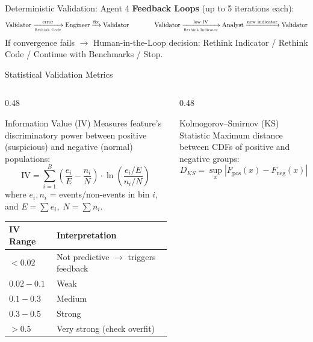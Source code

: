 \documentclass[10pt, aspectratio=169]{beamer}
\newcommand{\hlt}[1]{\textcolor{accentcyan}{#1}}
\newcommand{\hlr}[1]{\textcolor{accentred}{#1}}
\begin{document}
\begin{frame}{Deterministic Validation: Agent 4}
\vspace{0.5em}
\textbf{Feedback Loops} (up to 5 iterations each):
\[
  \text{Validator} \xrightarrow[\text{\tiny Rethink Code}]{\text{error}} \text{Engineer} \xrightarrow{\text{fix}} \text{Validator}
  \qquad\qquad
  \text{Validator} \xrightarrow[\text{\tiny Rethink Indicator}]{\text{low IV}} \text{Analyst} \xrightarrow{\text{new indicator}} \text{Validator}
\]
If convergence fails \(\to\) \hlt{Human-in-the-Loop} decision: Rethink Indicator / Rethink Code / Continue with Benchmarks / Stop.
\end{frame}

\begin{frame}{Statistical Validation Metrics}

\begin{columns}[T]
\begin{column}{0.48\textwidth}
  \begin{block}{Information Value (IV)}
    \scriptsize
    Measures feature's discriminatory power between positive (suspicious) and negative (normal) populations:
    \[
      \text{IV} = \sum_{i=1}^{B} \left(\frac{e_i}{E} - \frac{n_i}{N}\right) \cdot \ln\!\left(\frac{e_i / E}{n_i / N}\right)
    \]
    where \(e_i, n_i\) = events/non-events in bin \(i\), and \(E = \sum e_i,\; N = \sum n_i\).

    \vspace{0.5em}
    \begin{tabular}{ll}
      \toprule
      \textbf{IV Range} & \textbf{Interpretation} \\
      \midrule
      \(< 0.02\) & Not predictive \(\to\) \hlr{triggers feedback} \\
      \(0.02 - 0.1\) & Weak \\
      \(0.1 - 0.3\) & Medium \\
      \(0.3 - 0.5\) & Strong \\
      \(> 0.5\) & Very strong (check overfit) \\
      \bottomrule
    \end{tabular}
  \end{block}
\end{column}

\begin{column}{0.48\textwidth}
  \begin{block}{Kolmogorov--Smirnov (KS) Statistic}
    \scriptsize
    Maximum distance between CDFs of positive and negative groups:
    \[
      D_{KS} = \sup_x \left| F_{\text{pos}}(x) - F_{\text{neg}}(x) \right|
    \]


\end{block}
\end{column}
\end{columns}
\end{frame}
\end{document}
